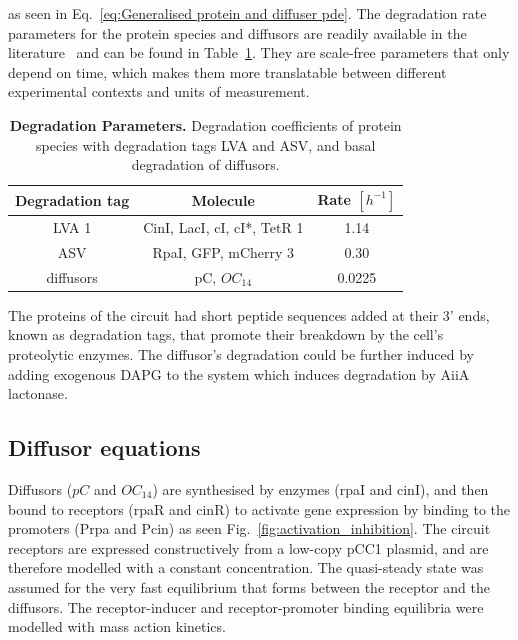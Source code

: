 as seen in Eq.~\ref{eq:Generalised protein and diffuser pde}.
The degradation rate parameters for the protein species and diffusors are readily available in the literature~\parencite{Andersen1998, kaufmann2005revisiting}
and can be found in Table~\ref{table:degradation table}.
They are scale-free parameters that only depend on time,
which makes them more translatable between different experimental contexts and units of measurement.



\begin{table}[H]
    \centering
    \begin{tabular}{|c|c|c|}
        \hline
        \textbf{Degradation tag} & \textbf{Molecule} & \textbf{Rate $[h^{-1}]$} \\
        \hline
        LVA 1 & CinI, LacI, cI, cI*, TetR 1 & 1.14 \\
        \hline
        ASV & RpaI, GFP, mCherry 3 & 0.30 \\
        \hline
        diffusors & pC, $OC_{14}$ & 0.0225 \\
        \hline
    \end{tabular}
    \caption{\textbf{Degradation Parameters.} Degradation coefficients of protein species with degradation tags LVA and ASV, and basal degradation of diffusors.}
    \label{table:degradation table}
\end{table}

The proteins of the circuit had short peptide sequences added at their 3’ ends,
known as degradation tags, that promote their breakdown by the cell’s proteolytic enzymes.
The diffusor's degradation could be further induced
by adding exogenous DAPG to the system which induces degradation by AiiA lactonase.

\subsection{Diffusor equations}
Diffusors ($pC$ and $OC_{14}$) are synthesised by enzymes (rpaI and cinI), and then bound to receptors (rpaR and cinR) to activate gene expression by binding to the promoters (Prpa and Pcin)
 as seen Fig.~\ref{fig:activation_inhibition}.
The circuit receptors are expressed constructively from a low-copy pCC1 plasmid,
and are therefore modelled with a constant concentration.
The quasi-steady state was assumed for the very fast equilibrium that forms between the receptor and the diffusors.
The receptor-inducer and receptor-promoter binding equilibria were modelled with mass action kinetics.

